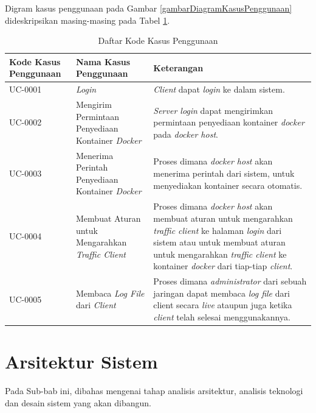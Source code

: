 	Digram kasus penggunaan pada Gambar \ref{gambarDiagramKasusPenggunaan} dideskripsikan masing-masing pada Tabel \ref{tabelKodeKasusPenggunaan}.
    \begin{longtable}{|p{}|p{}|p{}|} %

\caption{Daftar Kode Kasus Penggunaan} \label{tabelKodeKasusPenggunaan} \\
\hline
\textbf{Kode Kasus Penggunaan} & \textbf{Nama Kasus Penggunaan} & \textbf{Keterangan} \\ \hline

\endhead
\endfoot
\endlastfoot

UC-0001 & \textit{Login} & \textit{Client} dapat \textit{login} ke dalam sistem. \\ \hline
UC-0002 & Mengirim Permintaan Penyediaan Kontainer \textit{Docker} & \textit{Server login} dapat mengirimkan permintaan penyediaan kontainer \textit{docker} pada \textit{docker host}. \\ \hline
UC-0003 & Menerima Perintah Penyediaan Kontainer \textit{Docker}  &  Proses dimana \textit{docker host} akan menerima perintah dari sistem, untuk menyediakan kontainer secara otomatis.\\ \hline
UC-0004 & Membuat Aturan untuk Mengarahkan \textit{Traffic Client}  &  Proses dimana \textit{docker host} akan membuat aturan untuk mengarahkan \textit{traffic client} ke halaman \textit{login} dari sistem atau untuk membuat aturan untuk mengarahkan \textit{traffic client} ke kontainer \textit{docker} dari tiap-tiap \textit{client}. \\ \hline
UC-0005 & Membaca \textit{Log File} dari \textit{Client}  &  Proses dimana \textit{administrator} dari sebuah jaringan dapat membaca \textit{log file} dari client secara \textit{live} ataupun juga ketika \textit{client} telah selesai menggunakannya.\\ \hline
\end{longtable}

  \section{Arsitektur Sistem}
  	Pada Sub-bab ini, dibahas mengenai tahap analisis arsitektur, analisis teknologi dan desain sistem yang akan dibangun.
